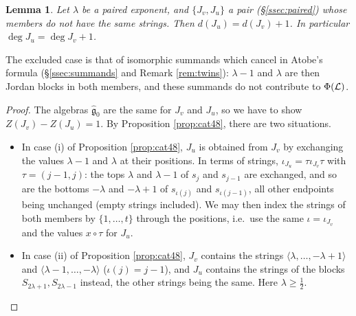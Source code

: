 \documentclass[a4paper,12pt,leqno]{amsart}
\theoremstyle{plain}
\newtheorem{lemma}[thm]{Lemma}
\theoremstyle{definition}
\begin{document}
\begin{lemma}\label{lem:degpaired} Let $\lambda$ be a paired exponent, and $\{J_v,J_u\}$ a pair
(\S\ref{ssec:paired}) whose members do not have the same strings. Then $d(J_u)=d(J_v)+1$. In particular
$\deg J_u=\deg J_v+1$.
\end{lemma}

\noindent The excluded case is that of isomorphic summands which cancel in Atobe's formula (\S\ref{ssec:summands}
and Remark \ref{rem:twins}): $\lambda-1$ and $\lambda$ are then Jordan blocks in both members, and
these summands do not contribute to $\Phi(\mathcal{L})$.

\begin{proof}
The algebras $\widehat{\mathfrak g}_0$ are the same for $J_v$ and $J_u$, so we have to show
$Z(J_v)-Z(J_u)=1$. By Proposition \ref{prop:cat48}, there are two
situations.
\begin{itemize}
\item[(E)] In case (i) of Proposition \ref{prop:cat48}, $J_u$ is obtained from $J_v$ by exchanging the values
$\lambda-1$ and $\lambda$ at their positions. In terms of strings, $\iota_{J_u}=\tau\iota_{J_v}\tau$ with
$\tau=(j-1,j)$: the tops $\lambda$ and $\lambda-1$ of $s_j$ and $s_{j-1}$ are exchanged, and so are the
bottoms $-\lambda$ and $-\lambda+1$ of $s_{\iota(j)}$ and $s_{\iota(j-1)}$, all other endpoints being
unchanged (empty strings included). We may then index the strings of both members by
$\{1,\ldots,t\}$ through the positions, i.e.\ use the same $\iota=\iota_{J_v}$ and the values $x\circ\tau$
for $J_u$.
\item[(D)] In case (ii) of Proposition \ref{prop:cat48}, $J_v$ contains the strings $\langle\lambda,\ldots,-\lambda+1\rangle$
and $\langle\lambda-1,\ldots,-\lambda\rangle$ ($\iota(j)=j-1$), and $J_u$ contains the strings of the
blocks $S_{2\lambda+1},S_{2\lambda-1}$ instead, the other strings being the same. Here
$\lambda\geq\tfrac12$.
\end{itemize}


\end{proof}
\end{document}
